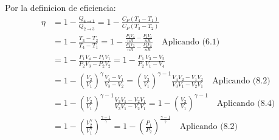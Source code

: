 \documentclass[a4paper]{article}
\begin{document}
\begin{answer}[Punto 8]
        Por la definicion de eficiencia:
        \begin{align*}
            \eta &= 1 - \frac{Q_{4\rightarrow 1}}{Q_{2\rightarrow 3}} = 1 - \frac{C_P (T_4 - T_1)}{C_P (T_3 - T_2)}\\
            &= 1 - \frac{T_3 - T_2}{T_4 - T_1} = 1 - \frac{\frac{P_1 V_4}{nR} - \frac{P_1 V_1}{nR}}{\frac{P_2 V_3}{nR}  -\frac{P_2 V_2}{nR}} \quad \text{Aplicando (6.1)}\\
            &= 1 - \frac{P_1V_4 -P_1 V_1 }{P_2 V_3 - P_2 V_2} = 1 - \frac{P_1}{P_2} \frac{V_3 - V_2}{V_1 - V_4}\\
            &= 1 - \left( \frac{V_2}{V_1} \right)^{\gamma} \frac{V_4 - V_1}{V_3 - V_2} = \left( \frac{V_2}{V_1} \right)^{\gamma-1} \frac{V_4V_2 - V_1V_2}{V_3V_1 - V_2V_1}  \quad \text{Aplicando (8.2)}\\
            &= 1 - \left( \frac{V_2}{V_1} \right)^{\gamma-1} \frac{ V_3 V_1 - V_2 V_1}{V_3 V_1 - V_2 V_1} = 1 - \left( \frac{V_2}{V_1} \right)^{\gamma-1} \quad \text{Aplicando (8.4)}\\
            &= 1 - \left( \frac{V_2^\gamma}{V_1^\gamma} \right)^{\frac{\gamma-1}{\gamma}} = 1 - \left( \frac{P_1}{P_2} \right)^{\frac{\gamma-1}{\gamma}} \quad \text{Aplicando (8.2)}\\
        \end{align*}
    \end{answer}
    
\end{document}
